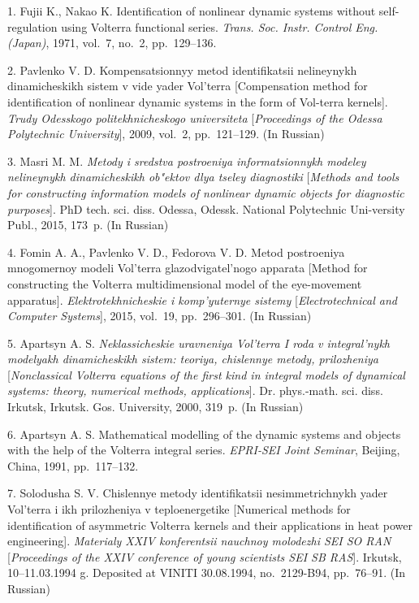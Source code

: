 \vskip 2mm

{\footnotesize

1. Fujii K., Nakao K. Identification of nonlinear dynamic systems
without self-regulation using Volterra functional series. {\it
Trans. Soc. Instr. Control Eng. (Japan)}, 1971, vol.~7, no.~2,
pp.~129--136.

2. Pavlenko V. D. Kompensatsionnyy metod identifikatsii
nelineynykh dinamicheskikh sistem v vide yader Vol'terra
[Compensation method for identification of nonlinear dynamic
systems in the form of Vol-\linebreak \newpage\noindent terra
kernels]. {\it Trudy Odesskogo politekhnicheskogo universiteta}
[{\it Proceedings of the Odessa Polytechnic University}], 2009,
vol.~2, pp.~121--129. (In Russian)

3. Masri M. M. {\it Metody i sredstva postroeniya informatsionnykh
modeley nelineynykh dinamicheskikh ob"ektov dlya tseley
diagnostiki} [{\it Methods and tools for constructing information
models of nonlinear dynamic objects for diagnostic purposes}]. PhD
tech. sci. diss. Odessa, Odessk. National Polytechnic
Uni-\linebreak versity Publ., 2015, 173~p. (In Russian)

4. Fomin A. A., Pavlenko V. D., Fedorova V. D. Metod postroeniya
mnogomernoy modeli Vol'terra glazodvigatel'nogo apparata [Method
for constructing the Volterra multidimensional model of the
eye-movement apparatus]. {\it Elektrotekhnicheskie i komp'yuternye
sistemy} [{\it Electrotechnical and Computer Systems}], 2015,
vol.~19, pp.~296--301. (In Russian)

5. Apartsyn A. S. {\it Neklassicheskie uravneniya Vol'terra I roda
v integral'nykh modelyakh dinamicheskikh sistem: teoriya,
chislennye metody, prilozheniya} [{\it Nonclassical Volterra
equations of the first kind in integral models of dynamical
systems: theory, numerical methods, applications}]. Dr.
phys.-math. sci. diss. Irkutsk, Irkutsk. Gos. University, 2000,
319~p. (In Russian)

6. Apartsyn A. S. Mathematical modelling of the dynamic systems
and objects with the help of the Volterra integral series. {\it
EPRI-SEI Joint Seminar}, Beijing, China, 1991, pp.~117--132.

7. Solodusha S. V. Chislennye metody identifikatsii
nesimmetrichnykh yader Vol'terra i ikh prilozheniya v
teploenergetike [Numerical methods for identification of
asymmetric Volterra kernels and their applications in heat power
engineering]. {\it Materialy XXIV konferentsii nauchnoy molodezhi
SEI SO RAN} [{\it Proceedings of the XXIV conference of young
scientists SEI SB RAS}]. Irkutsk, 10--11.03.1994 g. Deposited at
VINITI 30.08.1994, no.~2129-B94, pp.~76--91. (In Russian)

}
